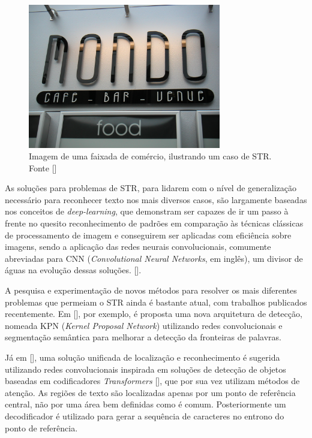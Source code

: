 \begin{figure}
    \centering
    \includegraphics[width=0.75\textwidth]{figs/img_139.jpg}
    \caption{Imagem de uma faixada de comércio, ilustrando um caso de STR. Fonte []}
    \label{fig:str-example}
\end{figure}

As soluções para problemas de STR, para lidarem com o nível de generalização necessário para reconhecer texto nos mais diversos casos, são largamente baseadas nos conceitos de \textit{deep-learning}, que demonstram ser capazes de ir um passo à frente no quesito reconhecimento de padrões em comparação às técnicas clássicas de processamento de imagem e conseguirem ser aplicadas com eficiência sobre imagens, sendo a aplicação das redes neurais convolucionais, comumente abreviadas para CNN (\textit{Convolutional Neural Networks}, em inglês), um divisor de águas na evolução dessas soluções. [].

A pesquisa e experimentação de novos métodos para resolver os mais diferentes problemas que permeiam o STR ainda é bastante atual, com trabalhos publicados recentemente.
Em [], por exemplo, é proposta uma nova arquitetura de detecção, nomeada KPN (\textit{Kernel Proposal Network}) utilizando redes convolucionais e segmentação semântica para melhorar a detecção da fronteiras de palavras.

Já em [], uma solução unificada de localização e reconhecimento é sugerida utilizando redes convolucionais inspirada em soluções de detecção de objetos baseadas em codificadores \textit{Transformers} [], que por sua vez utilizam métodos de atenção. As regiões de texto são localizadas apenas por um ponto de referência central, não por uma área bem definidas como é comum. Posteriormente um decodificador é utilizado para gerar a sequência de caracteres no entrono do ponto de referência.

